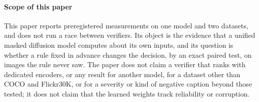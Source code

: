 \paragraph*{Scope of this paper}
This paper reports preregistered measurements on one model and two datasets, and does not run a race between verifiers.
Its object is the evidence that a unified masked diffusion model computes about its own inputs, and its question is whether a rule fixed in
advance changes the decision, by an exact paired test, on images the rule never saw.
The paper does not claim a verifier that ranks with dedicated encoders, or any result for another model, for a dataset other than COCO and
Flickr30K, or for a severity or kind of negative caption beyond those tested; it does not claim that the learned weights track reliability or corruption.
